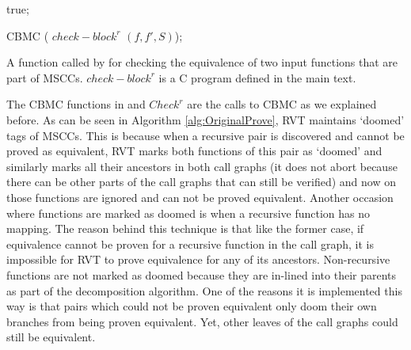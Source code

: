\begin{algorithm}
\begin{algorithmic}[1]


 true; \EndIf

 CBMC ( $check-block^r$  $(f,f',S)$); \EndFunction
\end{algorithmic}
\caption{A function called by  for checking the equivalence of two input functions that are part of MSCCs. $check-block^r$ is a C program defined in the main text.}
\label{alg:Checkr}
\end{algorithm}


The CBMC functions in  and $Check^r$ are the calls to CBMC as we explained before. As can be seen in Algorithm \ref{alg:OriginalProve}, RVT maintains `doomed' tags of MSCCs. This is because when a recursive pair is discovered and cannot be proved as equivalent, RVT marks both functions of this pair as `doomed' and similarly marks all their ancestors in both call graphs (it does not abort because there can be other parts of the call graphs that can still be verified) and now on those functions are ignored and can not be proved equivalent. Another occasion where functions are marked as doomed is when a recursive function has no mapping. The reason behind this technique is that like the former case, if equivalence cannot be proven for a recursive function in the call graph, it is impossible for RVT to prove equivalence for any of its ancestors. Non-recursive functions are not marked as doomed because they are in-lined into their parents as part of the decomposition algorithm. One of the reasons it is implemented this way is that pairs which could not be proven equivalent only doom their own branches from being proven equivalent. Yet, other leaves of the call graphs could still be equivalent. 

